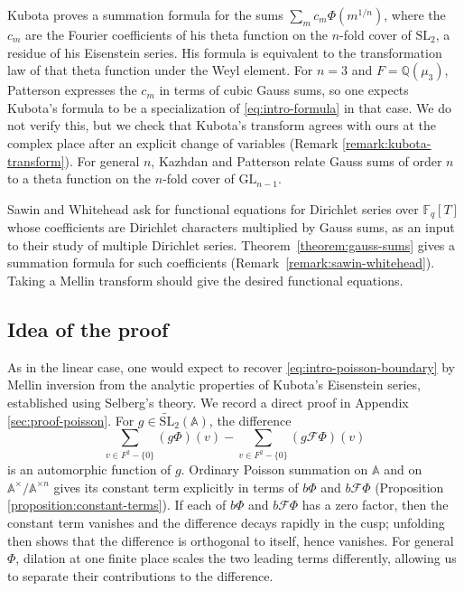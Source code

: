 \documentclass[reqno]{amsart}
\theoremstyle{plain}
\theoremstyle{definition}
\theoremstyle{itplain}
\numberwithin{equation}{section}
\numberwithin{theorem}{section}
\begin{document}
Kubota \cite{Kubota+1974+180+189} proves a summation formula for the sums $\sum_m c_m \Phi(m^{1/n})$, where the $c_m$ are the Fourier coefficients of his theta function on the $n$-fold cover of $\mathrm{SL}_2$, a residue of his Eisenstein series.  His formula is equivalent to the transformation law of that theta function under the Weyl element.  For $n = 3$ and $F = \mathbb{Q}(\mu_3)$, Patterson \cite{Patterson1977CubicTheta} expresses the $c_m$ in terms of cubic Gauss sums, so one expects Kubota's formula to be a specialization of \eqref{eq:intro-formula} in that case.  We do not verify this, but we check that Kubota's transform agrees with ours at the complex place after an explicit change of variables (Remark \ref{remark:kubota-transform}).  For general $n$, Kazhdan and Patterson \cite[pp.~36--37]{PMIHES_1984__59__35_0} relate Gauss sums of order $n$ to a theta function on the $n$-fold cover of $\mathrm{GL}_{n-1}$.

Sawin and Whitehead \cite[\S\S1.3, 1.5]{2025arXiv2507.08662} ask for functional equations for Dirichlet series over $\mathbb{F}_q[T]$ whose coefficients are Dirichlet characters multiplied by Gauss sums, as an input to their study of multiple Dirichlet series.  Theorem~\ref{theorem:gauss-sums} gives a summation formula for such coefficients (Remark~\ref{remark:sawin-whitehead}).  Taking a Mellin transform should give the desired functional equations.

\subsection{Idea of the proof}\label{sec:idea-of-the-proof}
As in the linear case, one would expect to recover \eqref{eq:intro-poisson-boundary} by Mellin inversion from the analytic properties of Kubota's Eisenstein series, established using Selberg's theory.  We record a direct proof in Appendix \ref{sec:proof-poisson}.  For $g \in \widetilde{\mathrm{SL}}_2(\mathbb{A})$, the difference
\begin{equation*}
   \sum_{v \in F^2 - \{0\}} (g \Phi)(v)
   -
   \sum_{v \in F^2 - \{0\}} (g \mathcal{F} \Phi)(v)
\end{equation*}
is an automorphic function of $g$.  Ordinary Poisson summation on $\mathbb{A}$ and on $\mathbb{A}^\times / \mathbb{A}^{\times n}$ gives its constant term explicitly in terms of $b \Phi$ and $b \mathcal{F} \Phi$ (Proposition \ref{proposition:constant-terms}).  If each of
$b \Phi$ and $b \mathcal{F} \Phi$ has a zero factor, then the constant term vanishes and the difference decays rapidly in the cusp; unfolding then shows that the difference is orthogonal to itself, hence vanishes.  For general $\Phi$, dilation at one finite place scales the two leading terms differently, allowing us to separate their contributions to the difference.
\end{document}
